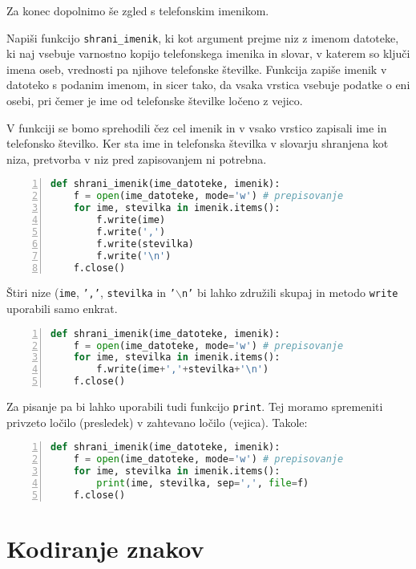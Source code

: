 Za konec dopolnimo še zgled s telefonskim imenikom.
\begin{zgled}
Napiši funkcijo \texttt{shrani\_imenik}, ki kot argument prejme niz z imenom datoteke, ki naj vsebuje varnostno kopijo telefonskega imenika in slovar, v katerem so ključi imena oseb, vrednosti pa njihove telefonske številke. Funkcija zapiše imenik v datoteko s podanim imenom, in sicer tako, da vsaka vrstica vsebuje podatke o eni osebi, pri čemer je ime od telefonske številke ločeno z vejico.
\end{zgled}
\begin{resitev}
V funkciji se bomo sprehodili čez cel imenik in v vsako vrstico zapisali ime in telefonsko številko. Ker sta ime in telefonska številka v slovarju shranjena kot niza, pretvorba v niz pred zapisovanjem ni potrebna.
\begin{lstlisting}[language=Python, showstringspaces=false,numbers=left]
def shrani_imenik(ime_datoteke, imenik):
    f = open(ime_datoteke, mode='w') # prepisovanje
    for ime, stevilka in imenik.items():
        f.write(ime) 
        f.write(',')
        f.write(stevilka)
        f.write('\n')
    f.close()
\end{lstlisting}
Štiri nize (\texttt{ime}, \texttt{','}, \texttt{stevilka} in \texttt{'$\backslash$n'} bi lahko združili skupaj in metodo \texttt{write} uporabili samo enkrat.
\begin{lstlisting}[language=Python, showstringspaces=false,numbers=left]
def shrani_imenik(ime_datoteke, imenik):
    f = open(ime_datoteke, mode='w') # prepisovanje
    for ime, stevilka in imenik.items():
        f.write(ime+','+stevilka+'\n')
    f.close()
\end{lstlisting}
Za pisanje pa bi lahko uporabili tudi funkcijo \texttt{print}. Tej moramo spremeniti privzeto ločilo (presledek) v zahtevano ločilo (vejica). Takole:
\begin{lstlisting}[language=Python, showstringspaces=false,numbers=left]
def shrani_imenik(ime_datoteke, imenik):
    f = open(ime_datoteke, mode='w') # prepisovanje
    for ime, stevilka in imenik.items():
        print(ime, stevilka, sep=',', file=f)
    f.close()
\end{lstlisting}
\end{resitev}

\section{Kodiranje znakov}

